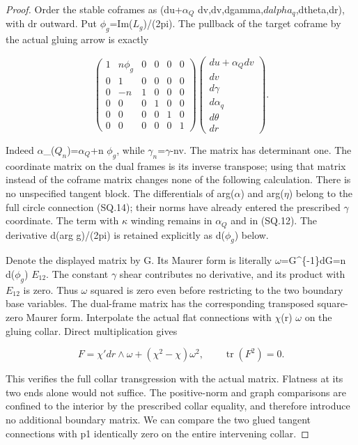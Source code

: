 \begin{proof}
Order the stable coframes as
(du+\(\alpha_{Q}\) dv,dv,dgamma,\(dalpha_{q}\),dtheta,dr), with dr outward.
Put \(\phi_{g}\)=Im(\(L_{g}\))/(2pi). The pullback of the target coframe by the
actual gluing arrow is exactly

\[
 \begin{pmatrix}
 1&n\phi_g&0&0&0&0\\
 0&1&0&0&0&0\\
 0&-n&1&0&0&0\\
 0&0&0&1&0&0\\
 0&0&0&0&1&0\\
 0&0&0&0&0&1
 \end{pmatrix}
 \begin{pmatrix}
 du+\alpha_Qdv\\dv\\d\gamma\\d\alpha_q\\d\theta\\dr
 \end{pmatrix}.
                                                        \tag{SQ.18}
\]

Indeed \(\alpha\)\_(\(Q_{n}\))=\(\alpha_{Q}\)+n \(\phi_{g}\), while \(\gamma_{n}\)=\(\gamma\)-nv.
The matrix has determinant one. The coordinate matrix on the dual
frames is its inverse transpose; using that matrix instead of the
coframe matrix changes none of the following calculation. There is
no unspecified tangent block. The differentials of arg(\(\alpha\)) and
arg(\(\eta\)) belong to the full circle connection (SQ.14); their norms
have already entered the prescribed \(\gamma\) coordinate. The term
with \(\kappa\) winding remains in \(\alpha_{Q}\) and in (SQ.12). The derivative
d(arg g)/(2pi) is retained explicitly as d(\(\phi_{g}\)) below.

Denote the displayed matrix by G. Its Maurer form is literally
\(\omega\)=G\^{}\{-1\}dG=n d(\(\phi_{g}\)) \(E_{12}\). The constant \(\gamma\) shear contributes
no derivative, and its product with \(E_{12}\) is zero. Thus \(\omega\) squared
is zero even before restricting to the two boundary base variables.
The dual-frame matrix has the corresponding transposed square-zero
Maurer form. Interpolate the actual flat connections with \(\chi\)(r) \(\omega\)
on the gluing collar. Direct multiplication gives

\[
 F=\chi' dr\wedge\omega+(\chi^2-\chi)\omega^2,
 \qquad\operatorname{tr}(F^2)=0.                       \tag{SQ.18a}
\]

This verifies the full collar transgression with the actual matrix.
Flatness at its two ends alone would not suffice. The positive-norm
and graph comparisons are confined to the interior by the prescribed
collar equality, and therefore introduce no additional boundary
matrix. We can compare the two glued tangent connections with p1
identically zero on the entire intervening collar.


\end{proof}
